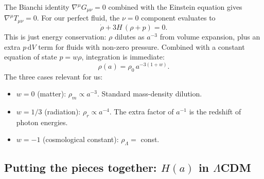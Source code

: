 The Bianchi identity $\nabla^\mu G_{\mu\nu} = 0$ combined with the Einstein equation gives $\nabla^\mu T_{\mu\nu} = 0$. For our perfect fluid, the $\nu = 0$ component evaluates to
\begin{equation}
  \dot\rho + 3 H\,(\rho + p) = 0.
  \label{eq:continuity}
\end{equation}
This is just energy conservation: $\rho$ dilutes as $a^{-3}$ from volume expansion, plus an extra $p\, \mathrm{d}V$ term for fluids with non-zero pressure. Combined with a constant equation of state $p = w\rho$, integration is immediate:
\begin{equation}
  \rho(a) = \rho_0\, a^{-3(1+w)}.
  \label{eq:rho_of_a}
\end{equation}
The three cases relevant for us:
\begin{itemize}
  \item $w = 0$ (matter): $\rho_m \propto a^{-3}$. Standard mass-density dilution.
  \item $w = 1/3$ (radiation): $\rho_r \propto a^{-4}$. The extra factor of $a^{-1}$ is the redshift of photon energies.
  \item $w = -1$ (cosmological constant): $\rho_\Lambda = $ const.
\end{itemize}

\subsection{Putting the pieces together: $H(a)$ in $\Lambda$CDM}


